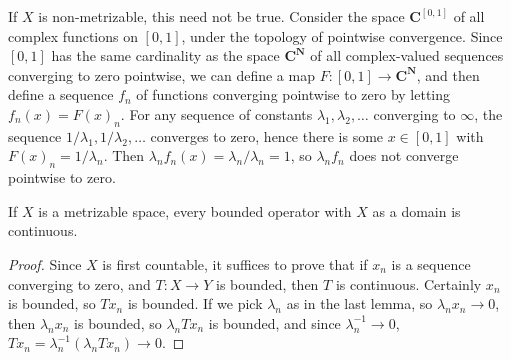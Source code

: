 \begin{example}
    If $X$ is non-metrizable, this need not be true. Consider the space $\mathbf{C}^{[0,1]}$ of all complex functions on $[0,1]$, under the topology of pointwise convergence. Since $[0,1]$ has the same cardinality as the space $\mathbf{C}^{\mathbf{N}}$ of all complex-valued sequences converging to zero pointwise, we can define a map $F: [0,1] \to \mathbf{C}^{\mathbf{N}}$, and then define a sequence $f_n$ of functions converging pointwise to zero by letting $f_n(x) = F(x)_n$. For any sequence of constants $\lambda_1, \lambda_2, \dots$ converging to $\infty$, the sequence $1/\lambda_1, 1/\lambda_2, \dots$ converges to zero, hence there is some $x \in [0,1]$ with $F(x)_n = 1/\lambda_n$. Then $\lambda_n f_n(x) = \lambda_n/\lambda_n = 1$, so $\lambda_n f_n$ does not converge pointwise to zero.
\end{example}

\begin{theorem}
    If $X$ is a metrizable space, every bounded operator with $X$ as a domain is continuous.
\end{theorem}
\begin{proof}
    Since $X$ is first countable, it suffices to prove that if $x_n$ is a sequence converging to zero, and $T: X \to Y$ is bounded, then $T$ is continuous. Certainly $x_n$ is bounded, so $Tx_n$ is bounded. If we pick $\lambda_n$ as in the last lemma, so $\lambda_n x_n \to 0$, then $\lambda_n x_n$ is bounded, so $\lambda_n Tx_n$ is bounded, and since $\lambda_n^{-1} \to 0$, $Tx_n = \lambda_n^{-1} (\lambda_n Tx_n) \to 0$.
\end{proof}

